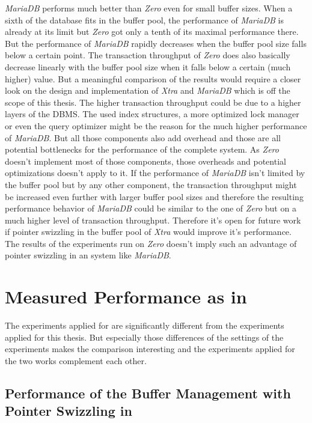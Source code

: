     \emph{MariaDB} performs much better than \emph{Zero} even for small buffer sizes. When a sixth of the database fits in the buffer pool, the performance of \emph{MariaDB} is already at its limit but \emph{Zero} got only a tenth of its maximal performance there. But the performance of \emph{MariaDB} rapidly decreases when the buffer pool size falls below a certain point. The transaction throughput of \emph{Zero} does also basically decrease linearly with the buffer pool size when it falls below a certain (much higher) value. But a meaningful comparison of the results would require a closer look on the design and implementation of \emph{Xtra} and \emph{MariaDB} which is off the scope of this thesis. The higher transaction throughput could be due to a higher layers of the DBMS. The used index structures, a more optimized lock manager or even the query optimizer might be the reason for the much higher performance of \emph{MariaDB}. But all those components also add overhead and those are all potential bottlenecks for the performance of the complete system. As \emph{Zero} doesn't implement most of those components, those overheads and potential optimizations doesn't apply to it. If the performance of \emph{MariaDB} isn't limited by the buffer pool but by any other component, the transaction throughput might be increased even further with larger buffer pool sizes and therefore the resulting performance behavior of \emph{MariaDB} could be similar to the one of \emph{Zero} but on a much higher level of transaction throughput. Therefore it's open for future work if pointer swizzling in the buffer pool of \emph{Xtra} would improve it's performance. The results of the experiments run on \emph{Zero} doesn't imply such an advantage of pointer swizzling in an system like \emph{MariaDB}.

\section{Measured Performance as in \cite{Graefe:2014}}

    The experiments applied for \cite{Graefe:2014} are significantly different from the experiments applied for this thesis. But especially those differences of the settings of the experiments makes the comparison interesting and the experiments applied for the two works complement each other.

\subsection{Performance of the Buffer Management with Pointer Swizzling in \cite{Graefe:2014}}

